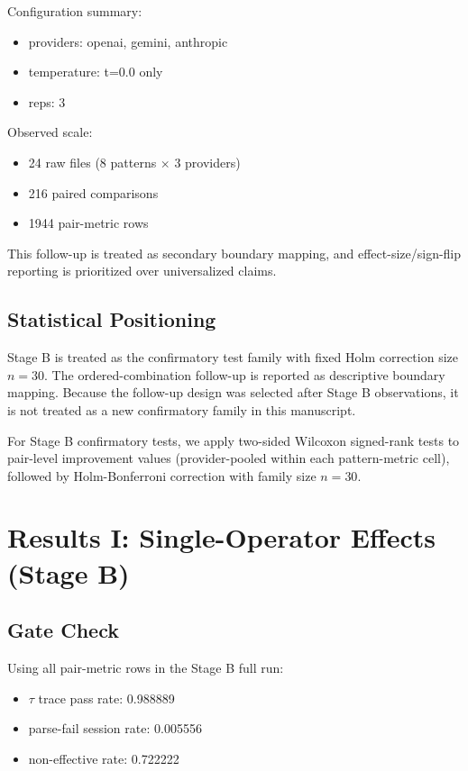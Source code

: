 \documentclass[11pt,a4paper]{article}
\begin{document}
Configuration summary:
\begin{itemize}
  \item providers: openai, gemini, anthropic
  \item temperature: t=0.0 only
  \item reps: 3
\end{itemize}

Observed scale:
\begin{itemize}
  \item 24 raw files (8 patterns $\times$ 3 providers)
  \item 216 paired comparisons
  \item 1944 pair-metric rows
\end{itemize}

This follow-up is treated as secondary boundary mapping, and effect-size/sign-flip reporting is prioritized over universalized claims.

\subsection{Statistical Positioning}

Stage B is treated as the confirmatory test family with fixed Holm correction size $n=30$. The ordered-combination follow-up is reported as descriptive boundary mapping. Because the follow-up design was selected after Stage B observations, it is not treated as a new confirmatory family in this manuscript.

For Stage B confirmatory tests, we apply two-sided Wilcoxon signed-rank tests to pair-level improvement values (provider-pooled within each pattern-metric cell), followed by Holm-Bonferroni correction with family size $n=30$.

\section{Results I: Single-Operator Effects (Stage B)}
\label{sec:results_stageb}

\subsection{Gate Check}

Using all pair-metric rows in the Stage B full run:
\begin{itemize}
  \item $\tau$ trace pass rate: 0.988889
  \item parse-fail session rate: 0.005556
  \item non-effective rate: 0.722222
\end{itemize}
\end{document}
